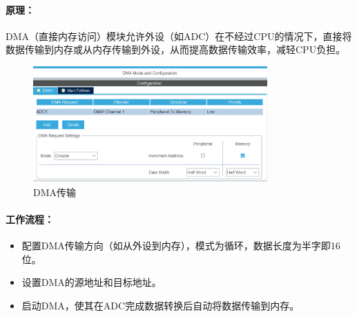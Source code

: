 \documentclass{article}
\begin{document}
\paragraph{原理：}
DMA（直接内存访问）模块允许外设（如ADC）在不经过CPU的情况下，直接将数据传输到内存或从内存传输到外设，从而提高数据传输效率，减轻CPU负担。
\begin{figure}[H]
    \centering
    \includegraphics[width=0.8\textwidth]{assets/4.png}
    \caption{DMA传输}
\end{figure}
\paragraph{工作流程：}
\begin{itemize}
    \item 配置DMA传输方向（如从外设到内存），模式为循环，数据长度为半字即16位。
    \item 设置DMA的源地址和目标地址。
    \item 启动DMA，使其在ADC完成数据转换后自动将数据传输到内存。
\end{itemize}
\end{document}

